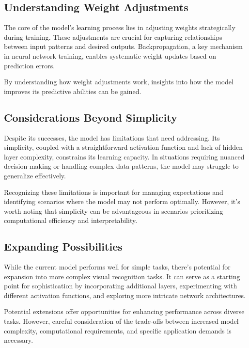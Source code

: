 \documentclass{article}
\begin{document}
\subsection{Understanding Weight Adjustments}

The core of the model's learning process lies in adjusting weights strategically during training. These adjustments are crucial for capturing relationships between input patterns and desired outputs. Backpropagation, a key mechanism in neural network training, enables systematic weight updates based on prediction errors.

By understanding how weight adjustments work, insights into how the model improves its predictive abilities can be gained.

\subsection{Considerations Beyond Simplicity}

Despite its successes, the model has limitations that need addressing. Its simplicity, coupled with a straightforward activation function and lack of hidden layer complexity, constrains its learning capacity. In situations requiring nuanced decision-making or handling complex data patterns, the model may struggle to generalize effectively.

Recognizing these limitations is important for managing expectations and identifying scenarios where the model may not perform optimally. However, it's worth noting that simplicity can be advantageous in scenarios prioritizing computational efficiency and interpretability.

\subsection{Expanding Possibilities}

While the current model performs well for simple tasks, there's potential for expansion into more complex visual recognition tasks. It can serve as a starting point for sophistication by incorporating additional layers, experimenting with different activation functions, and exploring more intricate network architectures.

Potential extensions offer opportunities for enhancing performance across diverse tasks. However, careful consideration of the trade-offs between increased model complexity, computational requirements, and specific application demands is necessary.
\end{document}
